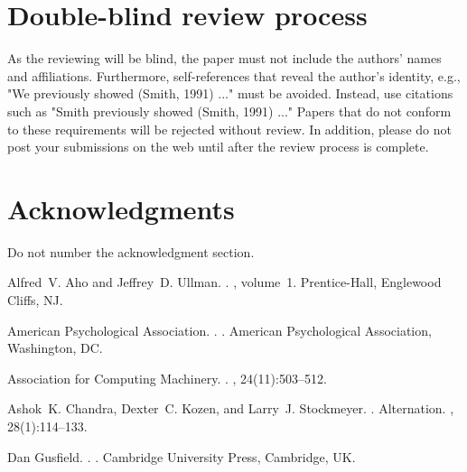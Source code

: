 \documentclass[11pt,letterpaper]{article}
\begin{document}
\section{Double-blind review process}
\label{sec:blind}

As the reviewing will be blind, the paper must not include the authors' names and affiliations. Furthermore, self-references that reveal the author's identity, e.g., "We previously showed (Smith, 1991) ..." must be avoided. Instead, use citations such as "Smith previously showed (Smith, 1991) ..." Papers that do not conform to these requirements will be rejected without review. In addition, please do not post your submissions on the web until after the review process is complete.

\section*{Acknowledgments}

Do not number the acknowledgment section.

\begin{thebibliography}{}

Alfred~V. Aho and Jeffrey~D. Ullman.
.
, volume~1.
\newblock Prentice-{Hall}, Englewood Cliffs, NJ.

{American Psychological Association}.
.
.
\newblock American Psychological Association, Washington, DC.

{Association for Computing Machinery}.
.
, 24(11):503--512.

Ashok~K. Chandra, Dexter~C. Kozen, and Larry~J. Stockmeyer.
.
\newblock Alternation.
,
  28(1):114--133.

Dan Gusfield.
.
.
\newblock Cambridge University Press, Cambridge, UK.

\end{thebibliography}
\end{document}
